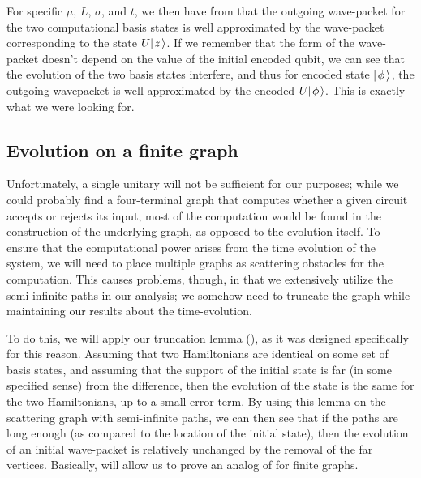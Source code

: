 \documentclass[../thesis-main/thesis-main]{subfiles}
\begin{document}
For specific $\mu$, $L$, $\sigma$, and $t$, we then have from  that the outgoing wave-packet for the two computational basis states is well approximated by the wave-packet corresponding to the state $U |\mspace{2mu} z \mspace{2mu} \rangle$.  If we remember that the form of the wave-packet doesn't depend on the value of the initial encoded qubit, we can see that the evolution of the two basis states interfere, and thus for  encoded state $|\mspace{2mu} \phi \mspace{2mu} \rangle$, the outgoing wavepacket is well approximated by the encoded $U|\mspace{2mu} \phi \mspace{2mu} \rangle$.  This is exactly what we were looking for.







\subsection{Evolution on a finite graph}\label{sec:SP_single_qubit_finite_graph}


Unfortunately, a single unitary will not be sufficient for our purposes; while we could probably find a four-terminal graph that computes whether a given circuit accepts or rejects its input, most of the computation would be found in the construction of the underlying graph, as opposed to the evolution itself.  To ensure that the computational power arises from the time evolution of the system, we will need to place multiple graphs as scattering obstacles for the computation.  This causes problems, though, in that we extensively utilize the semi-infinite paths in our analysis; we somehow need to truncate the graph while maintaining our results about the time-evolution.

To do this, we will apply our truncation lemma (), as it was designed specifically for this reason.  Assuming that two Hamiltonians are identical on some set of basis states, and assuming that the support of the initial state is far (in some specified sense) from the difference, then the evolution of the state is the same for the two Hamiltonians, up to a small error term.  By using this lemma on the scattering graph with semi-infinite paths, we can then see that if the paths are long enough (as compared to the location of the initial state), then the evolution of an initial wave-packet is relatively unchanged by the removal of the far vertices.  Basically,  will allow us to prove an analog of  for finite graphs.
\end{document}
